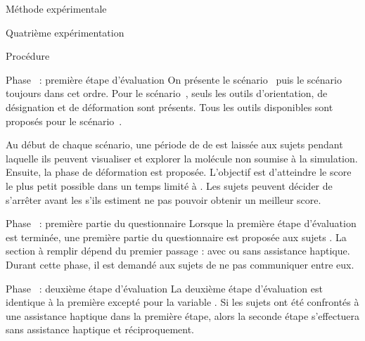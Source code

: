 \documentclass[myfrancais,ngerman,english,frenchb]{mythesis}
\begin{document}
\begin{mychapter}{Méthode expérimentale}
\begin{mysection}{Quatrième expérimentation}
\begin{mysubsection}{Procédure}
\begin{myparagraph}{Phase~ : première étape d'évaluation}
					On présente le scénario~ puis le scénario~ toujours dans cet ordre.
					Pour le scénario~, seuls les outils d'orientation, de désignation et de déformation sont présents.
					Tous les outils disponibles sont proposés pour le scénario~.

					Au début de chaque scénario, une période de  de \mybrainstorming est laissée aux sujets pendant laquelle ils peuvent visualiser et explorer la molécule non soumise à la simulation.
					Ensuite, la phase de déformation est proposée.
					L'objectif est d'atteindre le score  le plus petit possible dans un temps limité à .
					Les sujets peuvent décider de s'arrêter avant les  s'ils estiment ne pas pouvoir obtenir un meilleur score.
				\end{myparagraph}
				\begin{myparagraph}{Phase~ : première partie du questionnaire}
					Lorsque la première étape d'évaluation est terminée, une première partie du questionnaire est proposée aux sujets .
					La section à remplir dépend du premier passage : avec ou sans assistance haptique.
					Durant cette phase, il est demandé aux sujets de ne pas communiquer entre eux.
				\end{myparagraph}
				\begin{myparagraph}{Phase~ : deuxième étape d'évaluation}
					La deuxième étape d'évaluation est identique à la première excepté pour la variable .
					Si les sujets ont été confrontés à une assistance haptique dans la première étape, alors la seconde étape s'effectuera sans assistance haptique et réciproquement.


\end{myparagraph}
\end{mysubsection}
\end{mysection}
\end{mychapter}
\end{document}
